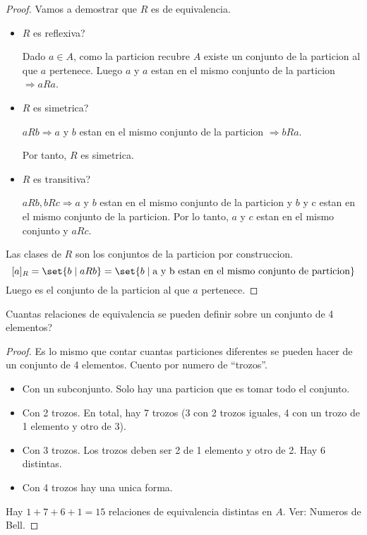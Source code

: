 \begin{proof}
	Vamos a demostrar que \(R \) es de equivalencia.

	\begin{itemize}
		\item \(R \) es reflexiva?

		      Dado \(a \in A \), como la particion recubre \(A \) existe un conjunto de la particion al que \(a \) pertenece. Luego \(a \) y \(a \) estan en el mismo conjunto de la particion \(\Rightarrow aRa \).

		\item \(R \) es simetrica?

		      \(aRb \Rightarrow a\) y \(b \) estan en el mismo conjunto de la particion \(\Rightarrow bRa \).

		      Por tanto, \(R \) es simetrica.

		\item \(R \) es transitiva?

		      \(aRb, bRc \Rightarrow a \) y \(b \) estan en el mismo conjunto de la particion y \(b \) y c estan en el mismo conjunto de la particion. Por lo tanto, \(a \) y \(c \) estan en el mismo conjunto y \(aRc \).
	\end{itemize}
	Las clases de \(R \) son los conjuntos de la particion por construccion.
	\[
		[a]_R = \set{b \mid aRb } = \set{b \mid \text{a y b estan en el mismo conjunto de particion} }
	\]
	Luego es el conjunto de la particion al que \(a \) pertenece.
\end{proof}

\begin{example}
	Cuantas relaciones de equivalencia se pueden definir sobre un conjunto de 4 elementos?
\end{example}
\begin{proof}
	Es lo mismo que contar cuantas particiones diferentes se pueden hacer de un conjunto de 4 elementos. Cuento por numero de ``trozos''.
	\begin{itemize}
		\item Con un subconjunto. Solo hay una particion que es tomar todo el conjunto.
		\item Con 2 trozos. En total, hay 7 trozos (3 con 2 trozos iguales, 4 con un trozo de 1 elemento y otro de 3).
		\item Con 3 trozos. Los trozos deben ser 2 de 1 elemento y otro de 2. Hay 6 distintas.
		\item Con 4 trozos hay una unica forma.
	\end{itemize}
	Hay \(1 + 7 + 6 + 1 = 15\) relaciones de equivalencia distintas en \(A \). Ver: Numeros de Bell.
\end{proof}

